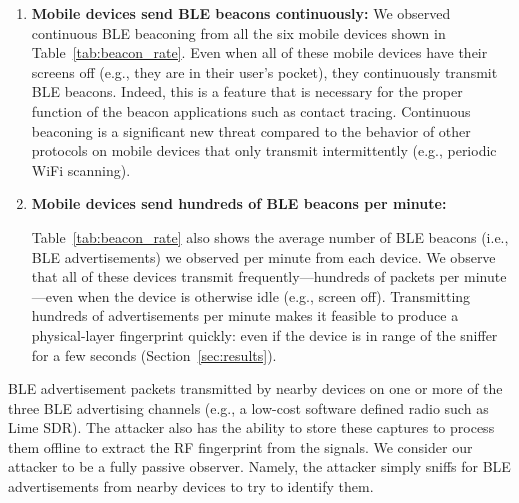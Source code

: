 \begin{enumerate}
\item \textbf{Mobile devices send BLE beacons continuously: }
%
We observed continuous BLE beaconing from all the six mobile devices shown in Table~\ref{tab:beacon_rate}.
%
%
Even when all of these mobile devices have their screens off (e.g., they are in their user's pocket), they
continuously transmit BLE beacons. Indeed, this is a feature that is necessary for the proper function of the beacon applications such as contact tracing.
%
Continuous beaconing is a significant new threat compared to the behavior of other protocols on mobile devices that only transmit intermittently (e.g., periodic WiFi scanning).

\item \textbf{Mobile devices send hundreds of BLE beacons per minute:}

Table~\ref{tab:beacon_rate} also shows the average number of BLE beacons (i.e.,
BLE advertisements) we observed per minute from each device.
%
We observe that all of these devices transmit frequently---hundreds of packets
per minute---even when the device is otherwise idle (e.g., screen off).
%
%
Transmitting hundreds of advertisements per minute makes it feasible to produce a physical-layer fingerprint quickly: even if the device is in range of
the sniffer for a few seconds (Section~\ref{sec:results}).


\end{enumerate}


BLE advertisement packets transmitted by
nearby devices on one or more of the three BLE advertising channels (e.g., a
low-cost software defined radio such as Lime SDR). The attacker also has the
ability to store these captures to process them offline to extract the RF
fingerprint from the signals.  We consider our attacker to be a fully passive
observer. Namely, the attacker simply sniffs for BLE advertisements from nearby
devices to try to identify them.

